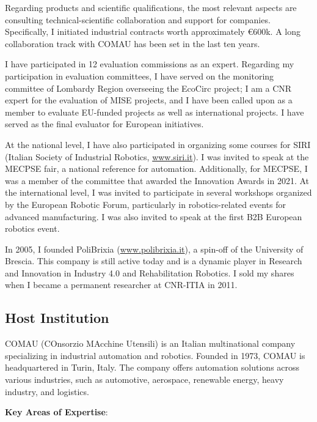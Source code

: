 Regarding products and scientific qualifications, the most relevant
aspects are consulting technical-scientific collaboration and support
for companies. Specifically, I initiated industrial contracts worth
approximately €600k. A long collaboration track with COMAU has been set
in the last ten years.

I have participated in 12 evaluation commissions as an expert. Regarding
my participation in evaluation committees, I have served on the
monitoring committee of Lombardy Region overseeing the EcoCirc project;
I am a CNR expert for the evaluation of MISE projects, and I have been
called upon as a member to evaluate EU-funded projects as well as
international projects. I have served as the final evaluator for
European initiatives.

At the national level, I have also participated in organizing some
courses for SIRI (Italian Society of Industrial Robotics,
\href{http://www.siri.it}{www.siri.it}). I was invited to speak at the
MECPSE fair, a national reference for automation. Additionally, for
MECPSE, I was a member of the committee that awarded the Innovation
Awards in 2021. At the international level, I was invited to participate
in several workshops organized by the European Robotic Forum,
particularly in robotics-related events for advanced manufacturing. I
was also invited to speak at the first B2B European robotics event.

In 2005, I founded PoliBrixia (\href{https://www.polibrixia.it}{www.polibrixia.it}), a spin-off of the
University of Brescia. This company is still active today and is a
dynamic player in Research and Innovation in Industry 4.0 and
Rehabilitation Robotics. I sold my shares when I became a permanent
researcher at CNR-ITIA in 2011.

\subsection{\texorpdfstring{Host Institution
}{Host Institution }}\label{host-institution-4}

COMAU (COnsorzio MAcchine Utensili) is an Italian multinational company
specializing in industrial automation and robotics. Founded in 1973,
COMAU is headquartered in Turin, Italy. The company offers automation
solutions across various industries, such as automotive, aerospace,
renewable energy, heavy industry, and logistics.

\textbf{Key Areas of Expertise}:

